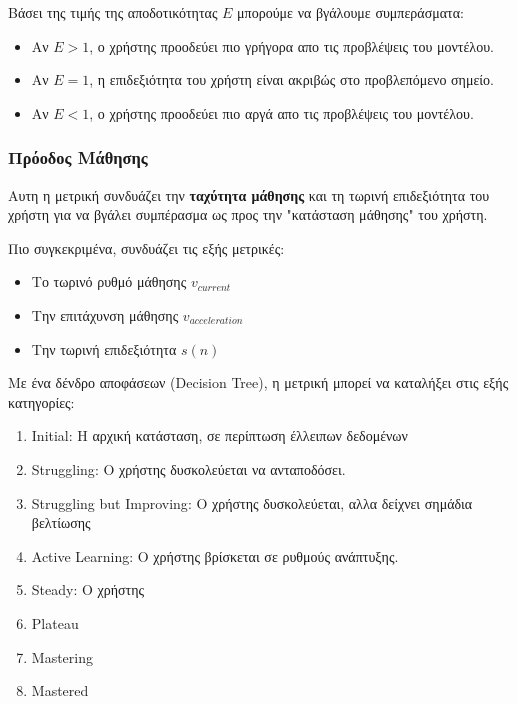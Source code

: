 Βάσει της τιμής της αποδοτικότητας $E$ μπορούμε να βγάλουμε συμπεράσματα:
\begin{itemize}
    \item Αν $E > 1$, ο χρήστης προοδεύει πιο γρήγορα απο τις προβλέψεις του μοντέλου.
    \item Αν $E = 1$, η επιδεξιότητα του χρήστη είναι ακριβώς στο προβλεπόμενο σημείο.
    \item Αν $E < 1$, ο χρήστης προοδεύει πιο αργά απο τις προβλέψεις του μοντέλου.
\end{itemize}

\subsubsection{Πρόοδος Μάθησης}
Αυτη η μετρική συνδυάζει την \textbf{ταχύτητα μάθησης} και τη τωρινή επιδεξιότητα του χρήστη για να βγάλει συμπέρασμα ως προς την "κατάσταση μάθησης" του χρήστη.

Πιο συγκεκριμένα, συνδυάζει τις εξής μετρικές:
\begin{itemize}
    \item Το τωρινό ρυθμό μάθησης \textbf{$v_{current}$}
    \item Την επιτάχυνση μάθησης \textbf{$v_{acceleration}$}
    \item Την τωρινή επιδεξιότητα \textbf{$s(n)$}
\end{itemize}

Με ένα δένδρο αποφάσεων (\textlatin{Decision Tree}), η μετρική μπορεί να καταλήξει στις εξής κατηγορίες:
\begin{enumerate}
    \item \textlatin{Initial}: Η αρχική κατάσταση, σε περίπτωση έλλειπων δεδομένων
    \item \textlatin{Struggling}: Ο χρήστης δυσκολεύεται να ανταποδόσει.
    \item \textlatin{Struggling but Improving}: Ο χρήστης δυσκολεύεται, αλλα δείχνει σημάδια βελτίωσης
    \item \textlatin{Active Learning}: Ο χρήστης βρίσκεται σε ρυθμούς ανάπτυξης.
    \item \textlatin{Steady}: Ο χρήστης
    \item \textlatin{Plateau}
    \item \textlatin{Mastering}
    \item \textlatin{Mastered}
\end{enumerate}
